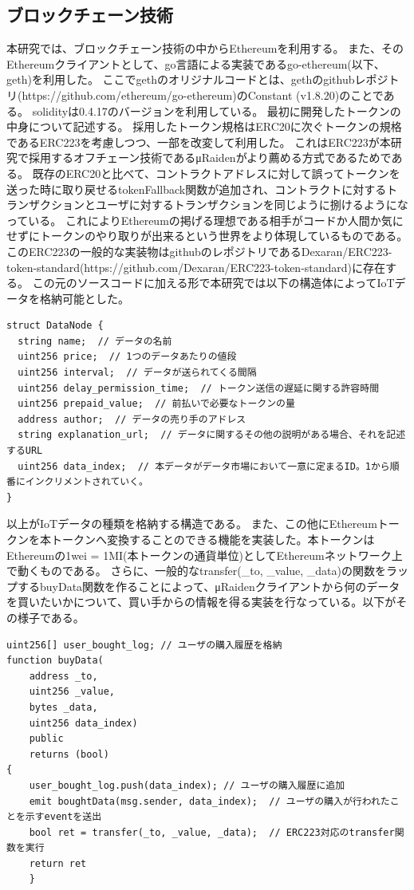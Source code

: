 \subsection{ブロックチェーン技術}
本研究では、ブロックチェーン技術の中からEthereumを利用する。
また、そのEthereumクライアントとして、go言語による実装であるgo-ethereum(以下、geth)を利用した。
ここでgethのオリジナルコードとは、gethのgithubレポジトリ(https://github.com/ethereum/go-ethereum)のConstant (v1.8.20)のことである。
solidityは0.4.17のバージョンを利用している。
最初に開発したトークンの中身について記述する。
採用したトークン規格はERC20に次ぐトークンの規格であるERC223を考慮しつつ、一部を改変して利用した。
これはERC223が本研究で採用するオフチェーン技術であるμRaidenがより薦める方式であるためである。
既存のERC20と比べて、コントラクトアドレスに対して誤ってトークンを送った時に取り戻せるtokenFallback関数が追加され、コントラクトに対するトランザクションとユーザに対するトランザクションを同じように捌けるようになっている。
これによりEthereumの掲げる理想である相手がコードか人間か気にせずにトークンのやり取りが出来るという世界をより体現しているものである。
このERC223の一般的な実装物はgithubのレポジトリであるDexaran/ERC223-token-standard(https://github.com/Dexaran/ERC223-token-standard)に存在する。
この元のソースコードに加える形で本研究では以下の構造体によってIoTデータを格納可能とした。
\begin{lstlisting}[caption=solidityによるデータを保持する構造体,label=DataNode]
struct DataNode {
  string name;  // データの名前
  uint256 price;  // 1つのデータあたりの値段
  uint256 interval;  // データが送られてくる間隔
  uint256 delay_permission_time;  // トークン送信の遅延に関する許容時間
  uint256 prepaid_value;  // 前払いで必要なトークンの量
  address author;  // データの売り手のアドレス
  string explanation_url;  // データに関するその他の説明がある場合、それを記述するURL
  uint256 data_index;  // 本データがデータ市場において一意に定まるID。1から順番にインクリメントされていく。
}
\end{lstlisting}
以上がIoTデータの種類を格納する構造である。
また、この他にEthereumトークンを本トークンへ変換することのできる機能を実装した。本トークンはEthereumの1wei = 1MI(本トークンの通貨単位)としてEthereumネットワーク上で動くものである。
さらに、一般的なtransfer(\_to, \_value, \_data)の関数をラップするbuyData関数を作ることによって、μRaidenクライアントから何のデータを買いたいかについて、買い手からの情報を得る実装を行なっている。以下がその様子である。
\begin{lstlisting}[caption=gethのEIP155のフォーク確認機能の削除 params/config.go ,label=DataNode]
uint256[] user_bought_log; // ユーザの購入履歴を格納
function buyData(
    address _to,
    uint256 _value,
    bytes _data,
    uint256 data_index)
    public
    returns (bool)
{
    user_bought_log.push(data_index); // ユーザの購入履歴に追加
    emit boughtData(msg.sender, data_index);  // ユーザの購入が行われたことを示すeventを送出
    bool ret = transfer(_to, _value, _data);  // ERC223対応のtransfer関数を実行
    return ret
    }
\end{lstlisting}
